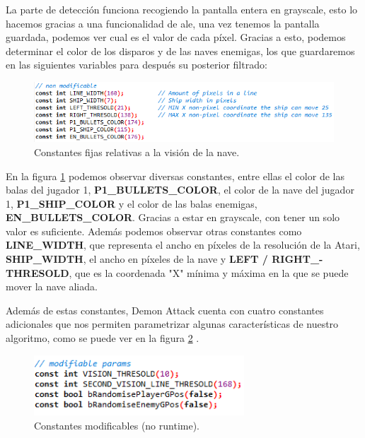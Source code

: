 La parte de detección funciona recogiendo la pantalla entera en grayscale, esto lo hacemos gracias a una funcionalidad de \ac{ale}, una vez tenemos la pantalla guardada, podemos ver cual es el valor de cada píxel. Gracias a esto, podemos determinar el color de los disparos y de las naves enemigas, los que guardaremos en las siguientes variables para después su posterior filtrado:

\begin{figure}[h]
	\centering
	\includegraphics[width=1\textwidth]{Figures/demonAttackStaticOne}
	\caption{Constantes fijas relativas a la visión de la nave.}
	\label{fig:demonAttackStaticOne}
\end{figure}

En la figura \ref{fig:demonAttackStaticOne} podemos observar diversas constantes, entre ellas el color de las balas del jugador 1, \textbf{P1\_BULLETS\_COLOR}, el color de la nave del jugador 1, \textbf{P1\_SHIP\_COLOR} y el color de las balas enemigas, \textbf{EN\_BULLETS\_COLOR}. Gracias a estar en grayscale, con tener un solo valor es suficiente. Además podemos observar otras constantes como \textbf{LINE\_WIDTH}, que representa el ancho en píxeles de la resolución de la Atari, \textbf{SHIP\_WIDTH}, el ancho en píxeles de la nave y \textbf{LEFT / RIGHT\_-THRESOLD}, que es la coordenada "X" mínima y máxima en la que se puede mover la nave aliada.

\newpage
Además de estas constantes, Demon Attack cuenta con cuatro constantes adicionales que nos permiten parametrizar algunas características de nuestro algoritmo, como se puede ver en la figura \ref{fig:demonAttackChangableOne} .

\begin{figure}[h]
	\centering
	\includegraphics[width=0.7\textwidth]{Figures/demonAttackChangableOne}
	\caption{Constantes modificables (no runtime).}
	\label{fig:demonAttackChangableOne}
\end{figure}

